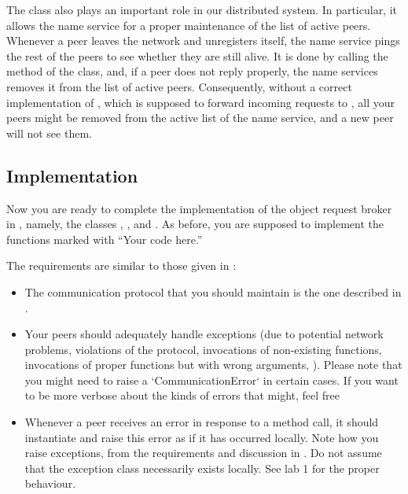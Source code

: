 \documentclass[a4paper]{article}
\begin{document}
The  class also plays an important role in our distributed
system. In particular, it allows the name service for a proper maintenance of
the list of active peers. Whenever a peer leaves the network and unregisters
itself, the name service pings the rest of the peers to see whether they are
still alive. It is done by calling the  method of the
 class, and, if a peer does not reply properly, the name
services removes it from the list of active peers. Consequently, without a
correct implementation of , which is supposed to forward
incoming requests to , all your peers might be removed from the
active list of the name service, and a new peer will not see them.

\subsection{Implementation}
Now you are ready to complete the implementation of the object request broker in
, namely, the classes , ,
and . As before, you are supposed to implement the functions
marked with ``Your code here.''

The requirements are similar to those given in :
\begin{itemize}

\item The communication protocol that you should maintain is the one
  described in .

  \item Your peers should adequately handle exceptions (due to
    potential network problems, violations of the protocol,
    invocations of non-existing functions, invocations of proper
    functions but with wrong arguments, \etc). Please note that you
    might need to raise a `CommunicationError` in certain cases. If
    you want to be more verbose about the kinds of errors that might,
    feel free

  \item Whenever a peer receives an error in response to a method
    call, it should instantiate and raise this error as if it has
    occurred locally. Note how you raise exceptions, from the
    requirements and discussion in . Do not assume that the
    exception class necessarily exists locally. See lab 1 for the
    proper behaviour.

\end{itemize}
\end{document}

